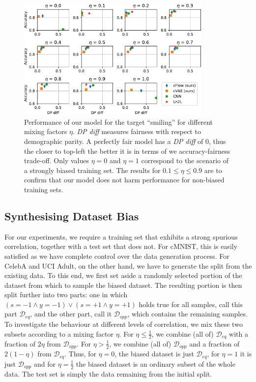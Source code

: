 \begin{figure}[tb]
    \centering
    \includegraphics[width=0.85\textwidth]{nifr/Figures/nosinn_celeba_multiplot_all_landscape_Smiling.pdf}
    \caption{
        Performance of our model for the target ``smiling'' for different mixing factors $\eta$.
        \emph{DP diff} measures fairness with respect to demographic parity.
        A perfectly fair model has a \emph{DP diff} of 0, thus the closer to top-left the better it
        is in terms of we accuracy-fairness trade-off.
        Only values $\eta=0$ and $\eta=1$ correspond to the scenario of a strongly biased training
        set.
        The results for $0.1\leq \eta\leq 0.9$ are to confirm that our model does not harm
        performance for non-biased training sets.
    }%
    \label{fig:celeba-multiplot}
\end{figure}
%
\subsection{Synthesising Dataset Bias}
%
For our experiments, we require a training set that exhibits a strong spurious correlation,
together with a test set that does not.
%
For cMNIST, this is easily satisfied as we have complete control over the data generation process.
%
For CelebA and  UCI Adult, on the other hand, we have to generate the split from the existing data.
%
To this end, we first set aside a randomly selected portion of the dataset from which to sample the
biased dataset.
%
The resulting portion is then split further into two parts: one in which \( (s=-1 \land y=-1) \lor
(s=+1 \land y=+1) \) holds true for all samples, call this part \( \mathcal{D}_{eq} \), and the
other part, call it \( \mathcal{D}_{opp} \), which contains the remaining samples.
%
To investigate the behaviour at different levels of correlation, we mix these two subsets according
to a mixing factor \( \eta \).
%
For $\eta \leq \tfrac{1}{2}$, we combine (all of) $\mathcal{D}_{eq}$ with a fraction of $2\eta$
from $\mathcal{D}_{opp}$.
%
For $\eta > \tfrac{1}{2}$, we combine (all of) $\mathcal{D}_{opp}$ and a fraction of $2(1 -\eta)$
from $\mathcal{D}_{eq}$.
%
Thus, for $\eta=0$, the biased dataset is just $\mathcal{D}_{eq}$, for $\eta=1$ it is just
$\mathcal{D}_{opp}$ and for $\eta=\tfrac{1}{2}$ the biased dataset is an ordinary subset of the
whole data. The test set is simply the data remaining from the initial split.
%
